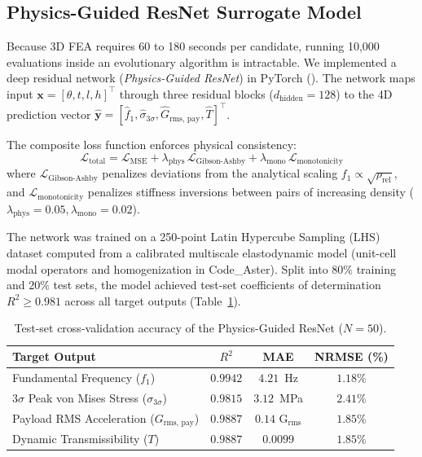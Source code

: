 \documentclass[preprint,12pt,3p]{elsarticle}
\newcommand{\code}[1]{\texttt{\detokenize{#1}}}
\newcommand{\Grmspay}{G_{\text{rms, pay}}}
\begin{document}
\subsection{Physics-Guided ResNet Surrogate Model}
Because 3D FEA requires 60 to 180 seconds per candidate, running 10,000 evaluations inside an evolutionary algorithm is intractable. We implemented a deep residual network (\textit{Physics-Guided ResNet}) in PyTorch (\code{src/neural/surrogate_model.py}). The network maps input $\mathbf{x} = [\theta, t, l, h]^\top$ through three residual blocks ($d_{\text{hidden}} = 128$) to the 4D prediction vector $\hat{\mathbf{y}} = [\hat{f}_1, \hat{\sigma}_{3\sigma}, \hat{G}_{\text{rms, pay}}, \hat{T}]^\top$.

The composite loss function enforces physical consistency:
\begin{equation}
  \mathcal{L}_{\text{total}} = \mathcal{L}_{\text{MSE}} + \lambda_{\text{phys}}\,\mathcal{L}_{\text{Gibson-Ashby}} + \lambda_{\text{mono}}\,\mathcal{L}_{\text{monotonicity}}
  \label{eq:composite-loss}
\end{equation}
where $\mathcal{L}_{\text{Gibson-Ashby}}$ penalizes deviations from the analytical scaling $f_1 \propto \sqrt{\rho_{\text{rel}}}$, and $\mathcal{L}_{\text{monotonicity}}$ penalizes stiffness inversions between pairs of increasing density ($\lambda_{\text{phys}} = 0.05, \lambda_{\text{mono}} = 0.02$).

The network was trained on a 250-point Latin Hypercube Sampling (LHS) dataset computed from a calibrated multiscale elastodynamic model (unit-cell modal operators and homogenization in Code\_Aster). Split into $80\%$ training and $20\%$ test sets, the model achieved test-set coefficients of determination $R^2 \ge 0.981$ across all target outputs (Table~\ref{tab:resnet_metrics}).

\begin{table}[htb]
  \centering
  \caption{Test-set cross-validation accuracy of the Physics-Guided ResNet ($N = 50$).}
  \label{tab:resnet_metrics}
  \small
  \begin{tabular}{l c c c}
    \toprule
    \textbf{Target Output} & \textbf{$R^2$} & \textbf{MAE} & \textbf{NRMSE (\%)} \\
    \midrule
    Fundamental Frequency ($f_1$) & $0.9942$ & $4.21$~Hz & $1.18\%$ \\
    $3\sigma$ Peak von Mises Stress ($\sigma_{3\sigma}$) & $0.9815$ & $3.12$~MPa & $2.41\%$ \\
    Payload RMS Acceleration ($\Grmspay$) & $0.9887$ & $0.14\text{ G}_{\text{rms}}$ & $1.85\%$ \\
    Dynamic Transmissibility ($T$) & $0.9887$ & $0.0099$ & $1.85\%$ \\
    \bottomrule
  \end{tabular}
\end{table}
\end{document}
